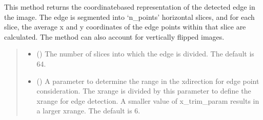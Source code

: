 \documentclass[letterpaper,10pt,english]{sphinxmanual}
\begin{document}
\begin{fulllineitems}
\begin{fulllineitems}
\begin{quote}
\begin{description}
\end{description}\end{quote}

\end{fulllineitems}


\begin{fulllineitems}
\label{\detokenize{forensicfit.core.tape:forensicfit.core.tape.TapeAnalyzer.get_coordinate_based}}
\pysigstartsignatures
{}
\pysigstopsignatures
\sphinxAtStartPar
This method returns the coordinate\sphinxhyphen{}based representation of the detected edge in the image.
The edge is segmented into ‘n\_points’ horizontal slices, and for each slice, the average
x and y coordinates of the edge points within that slice are calculated. The method can also
account for vertically flipped images.
\begin{quote}\begin{description}
\sphinxAtStartPar
{}

\begin{itemize}
\item {} 
\sphinxAtStartPar
{} (\sphinxstyleliteralemphasis{\sphinxupquote{, }}) \textendash{} The number of slices into which the edge is divided. The default is 64.

\item {} 
\sphinxAtStartPar
{} (\sphinxstyleliteralemphasis{\sphinxupquote{, }}) \textendash{} A parameter to determine the range in the x\sphinxhyphen{}direction for edge point consideration.
The x\sphinxhyphen{}range is divided by this parameter to define the x\sphinxhyphen{}range for edge detection.
A smaller value of x\_trim\_param results in a larger x\sphinxhyphen{}range. The default is 6.


\end{itemize}
\end{description}
\end{quote}
\end{fulllineitems}
\end{fulllineitems}
\end{document}
